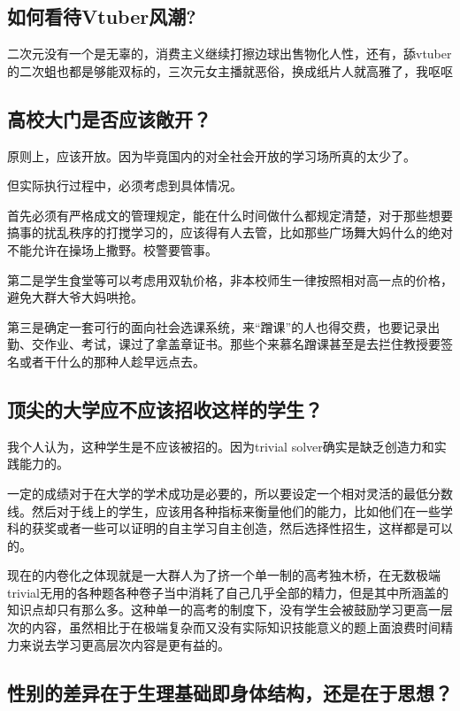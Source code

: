 \documentclass{ctexart}
\begin{document}
	\subsection{如何看待Vtuber风潮?}
	
	二次元没有一个是无辜的，消费主义继续打擦边球出售物化人性，还有，舔vtuber的二次蛆也都是够能双标的，三次元女主播就恶俗，换成纸片人就高雅了，我呕呕
	
	\subsection{高校大门是否应该敞开？}
	
	原则上，应该开放。因为毕竟国内的对全社会开放的学习场所真的太少了。
	
	但实际执行过程中，必须考虑到具体情况。
	
	首先必须有严格成文的管理规定，能在什么时间做什么都规定清楚，对于那些想要搞事的扰乱秩序的打搅学习的，应该得有人去管，比如那些广场舞大妈什么的绝对不能允许在操场上撒野。校警要管事。
	
	第二是学生食堂等可以考虑用双轨价格，非本校师生一律按照相对高一点的价格，避免大群大爷大妈哄抢。
	
	第三是确定一套可行的面向社会选课系统，来“蹭课”的人也得交费，也要记录出勤、交作业、考试，课过了拿盖章证书。那些个来慕名蹭课甚至是去拦住教授要签名或者干什么的那种人趁早远点去。
	
	\subsection{顶尖的大学应不应该招收这样的学生？}
	
	我个人认为，这种学生是不应该被招的。因为trivial solver确实是缺乏创造力和实践能力的。
	
	一定的成绩对于在大学的学术成功是必要的，所以要设定一个相对灵活的最低分数线。然后对于线上的学生，应该用各种指标来衡量他们的能力，比如他们在一些学科的获奖或者一些可以证明的自主学习自主创造，然后选择性招生，这样都是可以的。
	
	现在的内卷化之体现就是一大群人为了挤一个单一制的高考独木桥，在无数极端trivial无用的各种题各种卷子当中消耗了自己几乎全部的精力，但是其中所涵盖的知识点却只有那么多。这种单一的高考的制度下，没有学生会被鼓励学习更高一层次的内容，虽然相比于在极端复杂而又没有实际知识技能意义的题上面浪费时间精力来说去学习更高层次内容是更有益的。
	
	\subsection{性别的差异在于生理基础即身体结构，还是在于思想？}
	
\end{document}
